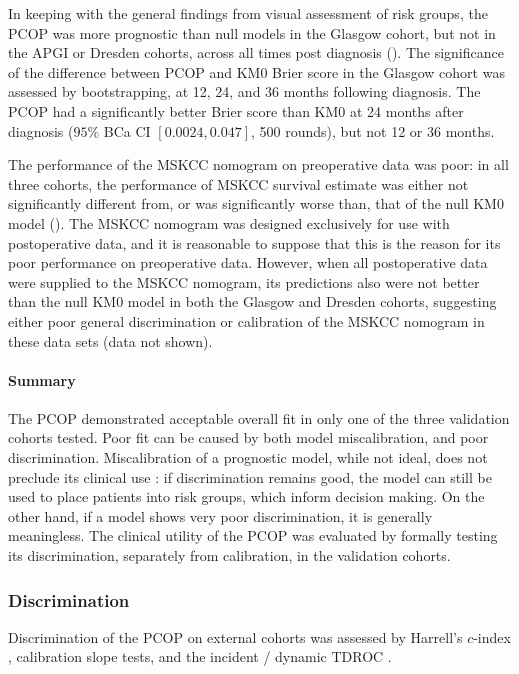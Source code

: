 \documentclass[dissertation.tex]{subfiles}
\begin{document}
In keeping with the general findings from visual assessment of risk groups, the \gls{PCOP} was more prognostic than null models in the Glasgow cohort, but not in the \gls{APGI} or Dresden cohorts, across all times post diagnosis ().  The significance of the difference between \gls{PCOP} and KM0 Brier score in the Glasgow cohort was assessed by bootstrapping, at 12, 24, and 36 months following diagnosis.  The \gls{PCOP} had a significantly better Brier score than KM0 at 24 months after diagnosis ($95\%$ BCa CI $[0.0024, 0.047]$, 500 rounds), but not 12 or 36 months.

The performance of the \gls{MSKCC} nomogram on preoperative data was poor: in all three cohorts, the performance of \gls{MSKCC} survival estimate was either not significantly different from, or was significantly worse than, that of the null KM0 model ().  The \gls{MSKCC} nomogram was designed exclusively for use with postoperative data, and it is reasonable to suppose that this is the reason for its poor performance on preoperative data.  However, when all postoperative data were supplied to the \gls{MSKCC} nomogram, its predictions also were not better than the null KM0 model in both the Glasgow and Dresden cohorts, suggesting either poor general discrimination or calibration of the \gls{MSKCC} nomogram in these data sets (data not shown).

\paragraph{Summary}
The \gls{PCOP} demonstrated acceptable overall fit in only one of the three validation cohorts tested.  Poor fit can be caused by both model miscalibration, and poor discrimination.  Miscalibration of a prognostic model, while not ideal, does not preclude its clinical use \cite{Steyerberg2010}: if discrimination remains good, the model can still be used to place patients into risk groups, which inform decision making.  On the other hand, if a model shows very poor discrimination, it is generally meaningless.  The clinical utility of the \gls{PCOP} was evaluated by formally testing its discrimination, separately from calibration, in the validation cohorts.

\subsubsection{Discrimination}
Discrimination of the \gls{PCOP} on external cohorts was assessed by Harrell's $c$-index \cite{Harrell1982}, calibration slope tests, and the incident / dynamic \gls{TDROC} \cite{Heagerty2005}.
\end{document}
